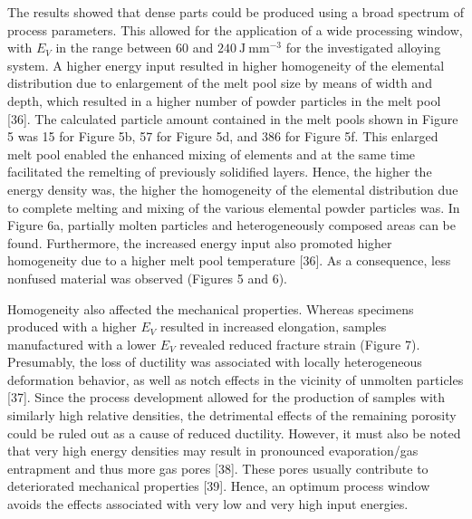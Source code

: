 \documentclass[10pt]{article}
\begin{document}
The results showed that dense parts could be produced using a broad spectrum of process parameters. This allowed for the application of a wide processing window, with $E_{V}$ in the range between 60 and $240 \mathrm{~J} \mathrm{~mm}^{-3}$ for the investigated alloying system. A higher energy input resulted in higher homogeneity of the elemental distribution due to enlargement of the melt pool size by means of width and depth, which resulted in a higher number of powder particles in the melt pool [36]. The calculated particle amount contained in the melt pools shown in Figure 5 was 15 for Figure 5b, 57 for Figure 5d, and 386 for Figure 5f. This enlarged melt pool enabled the enhanced mixing of elements and at the same time facilitated the remelting of previously solidified layers. Hence, the higher the energy density was, the higher the homogeneity of the elemental distribution due to complete melting and mixing of the various elemental powder particles was. In Figure 6a, partially molten particles and heterogeneously composed areas can be found. Furthermore, the increased energy input also promoted higher homogeneity due to a higher melt pool temperature [36]. As a consequence, less nonfused material was observed (Figures 5 and 6).

Homogeneity also affected the mechanical properties. Whereas specimens produced with a higher $E_{V}$ resulted in increased elongation, samples manufactured with a lower $E_{V}$ revealed reduced fracture strain (Figure 7). Presumably, the loss of ductility was associated with locally heterogeneous deformation behavior, as well as notch effects in the vicinity of unmolten particles [37]. Since the process development allowed for the production of samples with similarly high relative densities, the detrimental effects of the remaining porosity could be ruled out as a cause of reduced ductility. However, it must also be noted that very high energy densities may result in pronounced evaporation/gas entrapment and thus more gas pores [38]. These pores usually contribute to deteriorated mechanical properties [39]. Hence, an optimum process window avoids the effects associated with very low and very high input energies.
\end{document}
